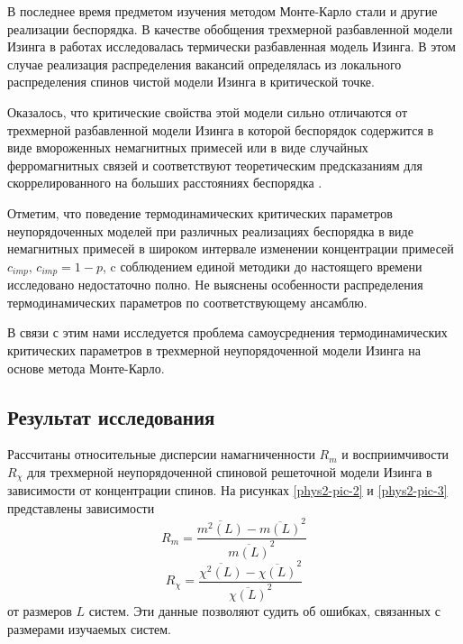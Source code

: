 В последнее время предметом изучения методом Монте-Карло стали и другие реализации беспорядка. В качестве обобщения трехмерной разбавленной модели Изинга в работах \cite{ph2_5, ph2_6} исследовалась термически разбавленная модель Изинга. В этом случае реализация распределения вакансий определялась из локального распределения спинов чистой модели Изинга в критической точке.

Оказалось, что критические свойства этой модели сильно отличаются от трехмерной разбавленной модели Изинга в которой беспорядок содержится в виде вмороженных немагнитных примесей или в виде случайных ферромагнитных связей и соответствуют теоретическим предсказаниям для скоррелированного на больших расстояниях беспорядка \cite{ph2_7}.

Отметим, что поведение термодинамических критических параметров неупорядоченных моделей при различных реализациях беспорядка в виде немагнитных примесей в широком интервале изменении концентрации примесей $c_{imp}$, $c_{imp}=1-p$, c соблюдением единой методики до настоящего времени исследовано недостаточно полно. Не выяснены особенности распределения термодинамических параметров по соответствующему ансамблю.

В связи с этим нами исследуется проблема самоусреднения термодинамических критических параметров в трехмерной неупорядоченной модели Изинга на основе метода Монте-Карло.






\subsection{Результат исследования}


Рассчитаны относительные дисперсии намагниченности  $R_m$ и восприимчивости $R_\chi$  для трехмерной неупорядоченной спиновой решеточной модели Изинга в зависимости от концентрации спинов.  На рисунках \ref{phys2-pic-2} и \ref{phys2-pic-3} представлены зависимости
\begin{equation*}
  R_m = \frac{\overline{m^2(L)}-\overline{m(L)}^2}{\overline{m(L)}^2}
\end{equation*}
\begin{equation*}
  R_\chi = \frac{\overline{\chi^2(L)}-\overline{\chi(L)}^2}{\overline{\chi(L)}^2}
\end{equation*}
от размеров $L$ систем. Эти данные позволяют судить об ошибках, связанных с размерами изучаемых систем.




